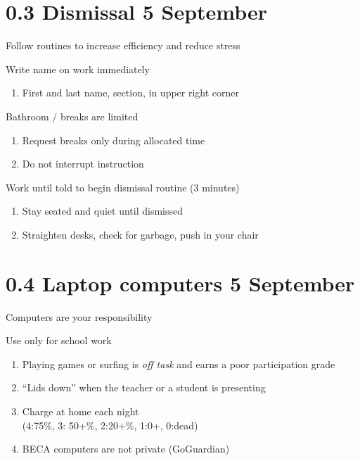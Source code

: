 \documentclass[onlytextwidth]{beamer}
\begin{document}
\section{0.3 Dismissal \hfill 5 September}
\begin{frame}{Follow routines to increase efficiency and reduce stress}
  \begin{block}{Write name on work immediately}
    \begin{enumerate}
      \item First and last name, section, in upper right corner
    \end{enumerate}
    \end{block}
  \begin{block}{Bathroom / breaks are limited}
    \begin{enumerate}
      \item Request breaks only during allocated time
      \item Do not interrupt instruction
    \end{enumerate}
    \end{block}
  \begin{block}{Work until told to begin dismissal routine (3 minutes)}
    \begin{enumerate}
      \item Stay seated and quiet until dismissed
      \item Straighten desks, check for garbage, push in your chair
    \end{enumerate}
    \end{block}
  \end{frame}

\section{0.4 Laptop computers \hfill 5 September}
\begin{frame}{Computers are your responsibility}
  \begin{block}{Use only for school work}
    \begin{enumerate}
      \item Playing games or surfing is \emph{off task} and earns a poor participation grade
      \item ``Lids down'' when the teacher or a student is presenting
      \item Charge at home each night\\
        (4:75\%, 3: 50+\%, 2:20+\%, 1:0+, 0:dead)
      \item BECA computers are not private (GoGuardian)
    \end{enumerate}
    \end{block}
  \end{frame}
\end{document}
